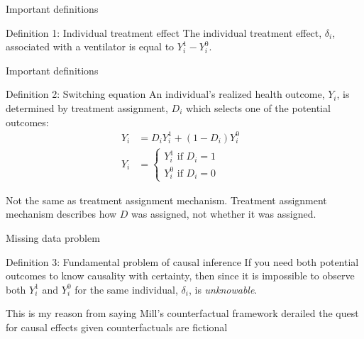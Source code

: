 \documentclass{beamer}
\begin{document}
\begin{frame}{Important definitions}

    \begin{block}{Definition 1: Individual treatment effect}
      The individual treatment effect,  $\delta_i$, associated with a ventilator is equal to $Y_i^1-Y_i^0$.
    \end{block}
\end{frame}


\begin{frame}{Important definitions}


    \begin{block}{Definition 2: Switching equation}
      An individual's realized health outcome, $Y_i$, is determined by treatment assignment, $D_i$ which selects one of the potential outcomes:
      \begin{eqnarray*}
        Y_i& = D_iY^1_i+(1-D_i)Y^0_i& \\
        Y_i& = \begin{cases}
          Y^1_i\text{ if }D_i=1 \\
          Y^0_i\text{ if }D_i=0
        \end{cases}
      \end{eqnarray*}
    \end{block}
    
    Not the same as treatment assignment mechanism.  Treatment assignment mechanism describes how $D$ was assigned, not whether it was assigned.

\end{frame}


\begin{frame}{Missing data problem}


    \begin{block}{Definition 3: Fundamental problem of causal inference}
      If you need both potential outcomes to know causality with certainty, then since it is impossible to observe both $Y_i^1$ and $Y_i^0$ for the same individual, $\delta_i$, is \emph{unknowable}.
    \end{block}

This is my reason from saying Mill's counterfactual framework derailed the quest for causal effects given counterfactuals are fictional
    
\end{frame}
\end{document}
